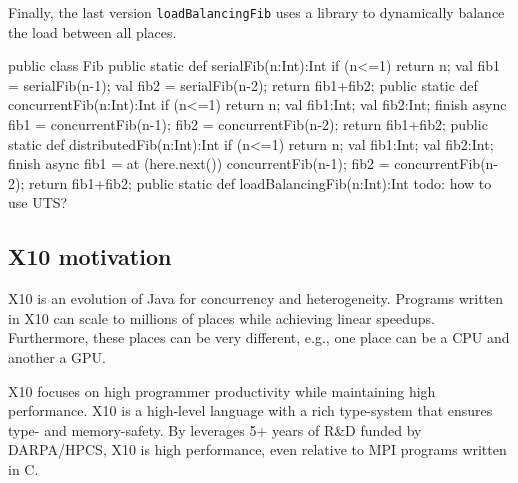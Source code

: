 \documentclass[a4paper]{article}
\def\codesmaller{\small}
\newcommand{\code}[1]{\texttt{\textup{\codesmaller #1}}}
\begin{document}
Finally, the last version \code{loadBalancingFib} uses a library to dynamically balance the load between all places.

\begin{xten}
public class Fib {
  public static def serialFib(n:Int):Int {
    if (n<=1) return n;
    val fib1 = serialFib(n-1);
    val fib2 = serialFib(n-2);
    return fib1+fib2;
  }
  public static def concurrentFib(n:Int):Int {
    if (n<=1) return n;
    val fib1:Int;
    val fib2:Int;
    finish {
      async
        fib1 = concurrentFib(n-1);
      fib2 = concurrentFib(n-2);
    }
    return fib1+fib2;
  }
  public static def distributedFib(n:Int):Int {
    if (n<=1) return n;
    val fib1:Int;
    val fib2:Int;
    finish {
      async
        fib1 = at (here.next())
          concurrentFib(n-1);
      fib2 = concurrentFib(n-2);
    }
    return fib1+fib2;
  }
  public static def loadBalancingFib(n:Int):Int {
    todo: how to use UTS?
  }
}
\end{xten}


\subsection{X10 motivation}
X10 is an evolution of Java for concurrency and heterogeneity.
Programs written in X10 can scale to millions of places while achieving linear speedups.
Furthermore, these places can be very different, e.g., one place can be a CPU and another a GPU.

X10 focuses on high programmer productivity while maintaining high performance.
X10 is a high-level language with a rich type-system that ensures type- and memory-safety.
By leverages 5+ years of R\&D funded by DARPA/HPCS, X10 is high performance,
    even relative to MPI programs written in C.
\end{document}
